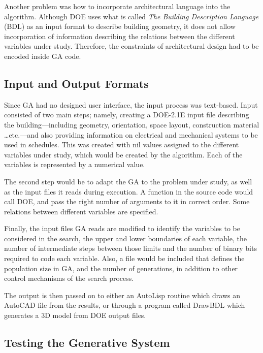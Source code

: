 Another problem was how to incorporate architectural language into the algorithm. Although DOE uses what is called \emph{The Building Description Language} (BDL) as an input format to describe building geometry, it does not allow incorporation of information describing the relations between the different variables under study. Therefore, the constraints of architectural design had to be encoded inside GA code.

\subsection{Input and Output Formats}

Since GA had no designed user interface, the input process was text-based. Input consisted of two main steps; namely, creating a DOE-2.1E input file describing the building---including geometry, orientation, space layout, construction material \ldots\hspace{0cm}etc.---and also providing information on electrical and mechanical systems to be used in schedules. This was created with nil values assigned to the different variables under study, which would be created by the algorithm. Each of the variables is represented by a numerical value.

The second step would be to adapt the GA to the problem under study, as well as the input files it reads during execution. A function in the source code would call DOE, and pass the right number of arguments to it in correct order. Some relations between different variables are specified. 

Finally, the input files GA reads are modified to identify the variables to be considered in the search, the upper and lower boundaries of each variable, the number of intermediate steps between those limits and the number of binary bits required to code each variable. Also, a file would be included that defines the population size in GA, and the number of generations, in addition to other control mechanisms of the search process.

The output is then passed on to either an AutoLisp routine which draws an AutoCAD file from the results, or through a program called DrawBDL which generates a 3D model from DOE output files.

\subsection{Testing the Generative System}


